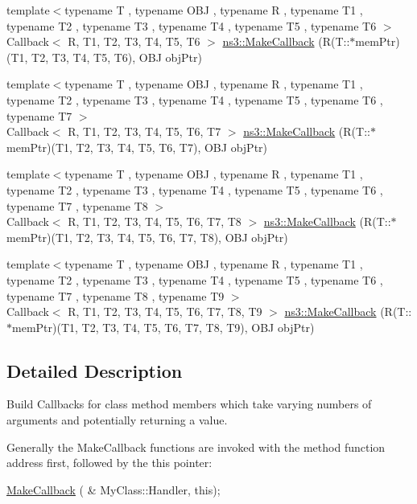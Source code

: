 \begin{DoxyCompactItemize}
\item 
{\footnotesize template$<$typename T , typename O\+BJ , typename R , typename T1 , typename T2 , typename T3 , typename T4 , typename T5 , typename T6 $>$ }\\Callback$<$ R, T1, T2, T3, T4, T5, T6 $>$ \hyperlink{group__makecallbackmemptr_gabc2cef6eb169d5ac4b100a1e28b1e172}{ns3\+::\+Make\+Callback} (R(T\+::$\ast$mem\+Ptr)(T1, T2, T3, T4, T5, T6), O\+BJ obj\+Ptr)
\item 
{\footnotesize template$<$typename T , typename O\+BJ , typename R , typename T1 , typename T2 , typename T3 , typename T4 , typename T5 , typename T6 , typename T7 $>$ }\\Callback$<$ R, T1, T2, T3, T4, T5, T6, T7 $>$ \hyperlink{group__makecallbackmemptr_gaa080bdd3c392c622788a15206bca2179}{ns3\+::\+Make\+Callback} (R(T\+::$\ast$mem\+Ptr)(T1, T2, T3, T4, T5, T6, T7), O\+BJ obj\+Ptr)
\item 
{\footnotesize template$<$typename T , typename O\+BJ , typename R , typename T1 , typename T2 , typename T3 , typename T4 , typename T5 , typename T6 , typename T7 , typename T8 $>$ }\\Callback$<$ R, T1, T2, T3, T4, T5, T6, T7, T8 $>$ \hyperlink{group__makecallbackmemptr_gac3aa72337b21ddd4f181e97306d549f6}{ns3\+::\+Make\+Callback} (R(T\+::$\ast$mem\+Ptr)(T1, T2, T3, T4, T5, T6, T7, T8), O\+BJ obj\+Ptr)
\item 
{\footnotesize template$<$typename T , typename O\+BJ , typename R , typename T1 , typename T2 , typename T3 , typename T4 , typename T5 , typename T6 , typename T7 , typename T8 , typename T9 $>$ }\\Callback$<$ R, T1, T2, T3, T4, T5, T6, T7, T8, T9 $>$ \hyperlink{group__makecallbackmemptr_ga54e6cd7d68957699af634d31f32e228c}{ns3\+::\+Make\+Callback} (R(T\+::$\ast$mem\+Ptr)(T1, T2, T3, T4, T5, T6, T7, T8, T9), O\+BJ obj\+Ptr)
\end{DoxyCompactItemize}


\subsection{Detailed Description}
Build Callbacks for class method members which take varying numbers of arguments and potentially returning a value.

Generally the {\ttfamily Make\+Callback} functions are invoked with the method function address first, followed by the {\ttfamily this} pointer\+: 
\begin{DoxyCode}
\hyperlink{group__makecallbackmemptr_ga9376283685aa99d204048d6a4b7610a4}{MakeCallback} ( & MyClass::Handler, \textcolor{keyword}{this});
\end{DoxyCode}


